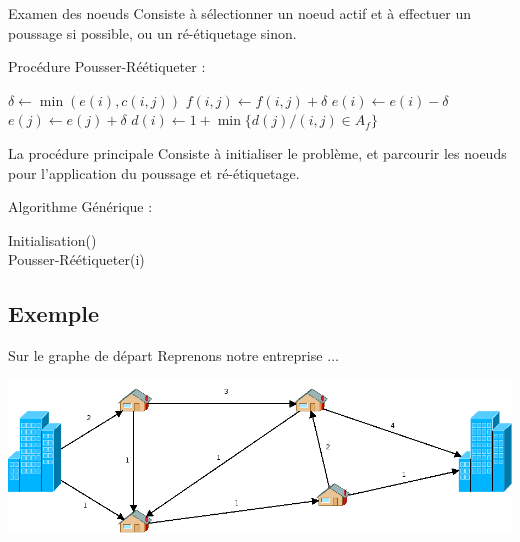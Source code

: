 \documentclass[hyperref={},
xcolor={dvipsnames,svgnames,table},10pt]{beamer}
\begin{document}
\begin{frame}{Examen des noeuds}
	Consiste à sélectionner un noeud actif et à effectuer un poussage si possible, ou un ré-étiquetage
	sinon. \vfill

	Procédure Pousser-Réétiqueter :
	\begin{algorithmic}[1]
				\STATE $\delta \leftarrow \min(e(i), c(i,j))$
				\STATE $f(i,j) \leftarrow f(i,j) + \delta$
				\STATE $e(i) \leftarrow e(i) - \delta$
				\STATE $e(j) \leftarrow e(j) + \delta$
			\ELSE
				\STATE $d(i) \leftarrow 1 + \min\{ d(j) / (i,j) \in A_f\}$
			\ENDIF
		\ENDIF
	\end{algorithmic}\vfill
\end{frame}

\begin{frame}{La procédure principale}
	Consiste à initialiser le problème, et parcourir les noeuds pour l'application du poussage et
	ré-étiquetage.\vfill

	Algorithme Générique :
	\begin{algorithmic}[1]
			\STATE Initialisation() \\
				\STATE Pousser-Réétiqueter(i) 
			\ENDWHILE
	\end{algorithmic}\vfill
\end{frame}

\subsection{Exemple}

\begin{frame}{Sur le graphe de départ}
	Reprenons notre entreprise $\dots$\vfill
	\begin{center}
		\includegraphics[scale=0.32]{img/exemple.png}
	\end{center}
\end{frame}
\end{document}
